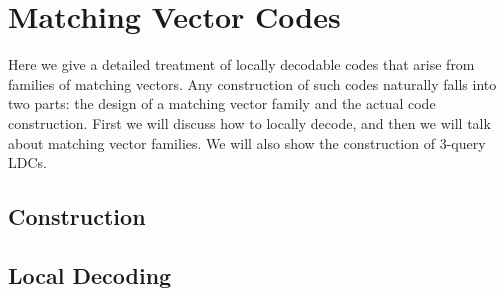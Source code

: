 \section{Matching Vector Codes}
Here we give a detailed treatment of locally decodable codes that arise from families of matching vectors. Any construction of such codes naturally falls into two parts: the design of a matching vector family and the actual code construction. First we will discuss how to locally decode, and then we will talk about matching vector families. We will also show the construction of 3-query LDCs. 
\subsection{Construction}

\subsection{Local Decoding}